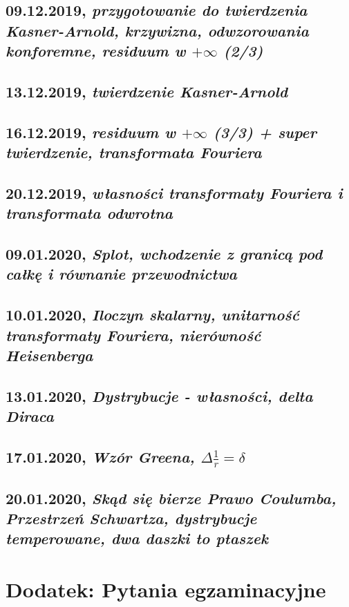 \documentclass[b5paper]{memoir}
\begin{document}
\chapter{09.12.2019, \textit{przygotowanie do twierdzenia Kasner-Arnold, krzywizna, odwzorowania konforemne, residuum w $+\infty$ (2/3)}}

\chapter{13.12.2019, \textit{twierdzenie Kasner-Arnold}}

\chapter{16.12.2019, \textit{residuum w $+\infty$ (3/3) + super twierdzenie, transformata Fouriera}}

\chapter{20.12.2019, \textit{własności transformaty Fouriera i transformata odwrotna}}

\chapter{09.01.2020, \textit{Splot, wchodzenie z granicą pod całkę i równanie przewodnictwa}}

\chapter{10.01.2020, \textit{Iloczyn skalarny, unitarność transformaty Fouriera, nierówność Heisenberga}}

\chapter{13.01.2020, \textit{Dystrybucje - własności, delta Diraca}}

\chapter{17.01.2020, \textit{Wzór Greena, $\Delta \frac{1}{r} = \delta$ }}

\chapter{20.01.2020, \textit{Skąd się bierze Prawo Coulumba, Przestrzeń Schwartza, dystrybucje temperowane, dwa daszki to ptaszek}}


\part{\textbf{Dodatek:} Pytania egzaminacyjne}

\end{document}
